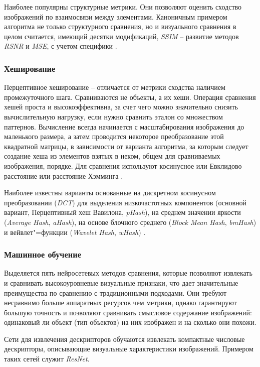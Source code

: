 \documentclass[variant=courcework]{bsuir}
\begin{document}
Наиболее популярны структурные метрики. Они позволяют оценить сходство
изображений по взаимосвязи между элементами. Каноничным примером алгоритма не
только структурного сравнения, но и визуального сравнения в целом считается,
имеющий десятки модификаций, \textit{SSIM} -- развитие методов \textit{RSNR} и
\textit{MSE}, с учетом специфики 
\cite{wang2004image}.

\subsubsection{Хеширование}
Перцептивное хеширование -- отличается от метрики сходства наличием
промежуточного шага. Сравниваются не объекты, а их хеши. Операция сравнения
хешей проста и высокоэффективна, за счет чего можно значительно снизить
вычислительную нагрузку, если нужно сравнить эталон со множеством паттернов.
Вычисление всегда начинается с масштабирования изображения до маленького
размера, а затем проводится некоторое преобразование этой квадратной матрицы, в
зависимости от варианта алгоритма, за которым следует создание хеша из элементов
взятых в неком, общем для сравниваемых изображения, порядке. Для сравнения
используют косинусное или Евклидово расстояние или расстояние Хэмминга
\cite{zauner2010implementation}.

Наиболее известны варианты основанные на дискретном косинусном преобразовании
(\textit{DCT}) для выделения низкочастотных компонентов (основной вариант,
Перцептивный хеш Вавилона, \textit{pHash})\cite{zauner2010implementation}, на
среднем значении яркости (\textit{Average Hash}, \textit{aHash}), на основе
блочного среднего (\textit{Block Mean Hash}, \textit{bmHash}) и вейвлет"=функции
(\textit{Wavelet Hash}, \textit{wHash}) \cite{zauner2010implementation}.

\subsubsection{Машинное обучение}
Выделяется пять нейросетевых методов сравнения, которые позволяют извлекать и
сравнивать высокоуровневые визуальные признаки, что дает значительные
преимущества по сравнению с традиционными подходами. Они требуют несравнимо
больше аппаратных ресурсов чем метрики, однако гарантируют большую точность и
позволяют сравнивать смысловое содержание изображений: одинаковый ли объект (тип
объектов) на них изображен и на сколько они похожи.

Сети для извлечения дескрипторов обучаются извлекать компактные числовые
дескрипторы, описывающие визуальные характеристики изображений. Примером таких
сетей служит \textit{ResNet}\cite{simonyan2015deep}.
\end{document}
